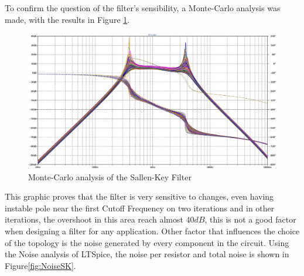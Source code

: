 To confirm the question of the filter's sensibility, a Monte-Carlo analysis was made, with the results in Figure \ref{fig:Monte-CarloSKFilter}.
\begin{figure}[H]
    \centering
    \includegraphics*[scale = 0.25]{Images/Monte-CarloSK.png}
    \caption{Monte-Carlo analysis of the Sallen-Key Filter}
    \label{fig:Monte-CarloSKFilter}
\end{figure}

This graphic proves that the filter is very sensitive to changes, even having instable pole near the first Cutoff Frequency on two iterations and in other iterations, the overshoot in this area reach almost $40 dB$, this is not a good factor when designing a filter for any application. Other factor that influences the choice of the topology is the noise generated by every component in the circuit. Using the Noise analysis of LTSpice, the noise per resistor and total noise is shown in Figure\ref{fig:NoiseSK}.

